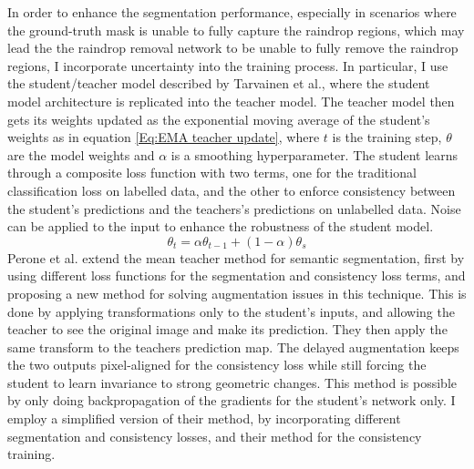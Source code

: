 \documentclass[11pt]{ociamthesis}  %
\begin{document}
In order to enhance the segmentation performance, especially in scenarios where the ground-truth mask is unable to fully capture the raindrop regions, which may lead the the raindrop removal network to be unable to fully remove the raindrop regions, I incorporate uncertainty into the training process. In particular, I use the student/teacher model described by Tarvainen et al.\cite{tarvainen2017mean}, where the student model architecture is replicated into the teacher model. The teacher model then gets its weights updated as the exponential moving average of the student's weights as in equation \ref{Eq:EMA teacher update}, where $t$ is the training step, $\theta$ are the model weights and $\alpha$ is a smoothing hyperparameter. The student learns through a composite loss function with two terms, one for the traditional classification loss on labelled data, and the other to enforce consistency between the student's predictions and the teachers's predictions on unlabelled data. Noise can be applied to the input to enhance the robustness of the student model. 
\noindent
\begin{equation}
    \theta_{t} = \alpha \theta_{t-1} + (1-\alpha)\theta_s
    \label{Eq:EMA teacher update}
\end{equation}
\noindent
Perone et al.\cite{Perone_2018} extend the mean teacher method for semantic segmentation, first by using different loss functions for the segmentation and consistency loss terms, and proposing a new method for solving augmentation issues in this technique. This is done by applying transformations only to the student's inputs, and allowing the teacher to see the original image and make its prediction. They then apply the same transform to the teachers prediction map. The delayed augmentation keeps the two outputs pixel-aligned for the consistency loss while still forcing the student to learn invariance to strong geometric changes. This method is possible by only doing backpropagation of the gradients for the student's network only. I employ a simplified version of their method, by incorporating different segmentation and consistency losses, and their method for the consistency training. 
\end{document}
